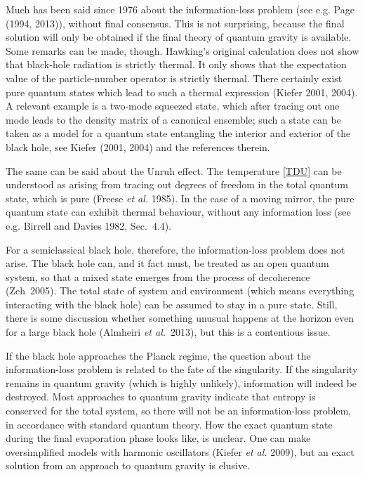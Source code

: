 \documentclass[12pt,a4paper]{article}
\begin{document}
Much has been said since 1976 about the information-loss problem
(see e.g. Page (1994, 2013)), without final consensus. This is not
surprising, because the final solution will only be obtained if the
final theory of quantum gravity is available. Some remarks can 
be made, though. Hawking's original calculation does not show that
black-hole radiation is strictly thermal. It only shows that the expectation
value of the particle-number operator is strictly thermal. There certainly exist
pure quantum states which lead to such a thermal expression (Kiefer
2001, 2004). A relevant example is a two-mode squeezed state, which
after tracing out one mode leads to the density matrix of a canonical
ensemble; such a state can be taken as a model for a quantum state
entangling the interior and exterior of the black hole, see Kiefer
(2001, 2004) and the references therein. 

The same can be said about the Unruh effect. The temperature
\eqref{TDU} can be understood as arising from tracing out degrees of
freedom in the total quantum state, which is pure (Freese {\em et al.}
1985). In the case of a moving mirror, the pure quantum state can
exhibit thermal behaviour, without any information loss (see
e.g. Birrell and Davies 1982, Sec.~4.4). 

For a semiclassical black hole, therefore, the information-loss
problem does not arise. The black hole can, and it fact must, be
treated as an open quantum system, so that a mixed state emerges from
the process of decoherence (Zeh~2005). The total state of system and
environment (which means everything interacting with the black hole)
can be assumed to stay in a pure state.  Still, there is some
discussion whether something unusual happens at the horizon even for a
large black hole (Almheiri {\em et al.}~2013), but this is a
contentious issue. 

If the black hole approaches the Planck regime, the question about the
information-loss problem is related to the fate of the singularity. 
If the singularity remains in quantum gravity (which is highly
unlikely), information will indeed be destroyed. Most approaches to
quantum gravity indicate that entropy is conserved for the total
system, so there will not be an information-loss problem, in
accordance with standard quantum theory. How the exact quantum state
during the final evaporation phase looks like, is unclear. One can
make oversimplified models with harmonic oscillators (Kiefer {\em et
  al.} 2009), but an exact solution from an approach to quantum
gravity is elusive. 
\end{document}
